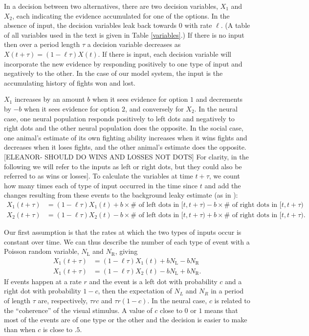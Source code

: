 \documentclass{article}
\begin{document}
In a decision between two alternatives, there are two decision variables, $X_1$ and $X_2$, each indicating the evidence accumulated for one of the options. In the absence of input, the decision variables leak back towards $0$ with rate $\ell$.  (A table of all variables used in the text is given in Table \ref{variables}.)  If there is no input then over a period length $\tau$ a decision variable decreases as $X(t+\tau)=(1-\ell\tau)X(t)$. If there is input, each decision variable will incorporate the new evidence by responding positively to one type of input and negatively to the other.  In the case of our model system, the input is the accumulating history of fights won and lost. 

$X_1$ increases by an amount $b$ when it sees evidence for option $1$ and decrements by $-b$ when it sees evidence for option $2$, and conversely for $X_2$.  In the neural case, one neural population responds positively to left dots and negatively to right dots and the other neural population does the opposite.  In the social case, one animal's estimate of its own fighting ability increases when it wins fights and decreases when it loses fights, and the other animal's estimate does the opposite.  [ELEANOR- SHOULD DO WINS AND LOSSES NOT DOTS] For clarity, in the following we will refer to the inputs as left or right dots, but they could also be referred to as wins or losses]. To calculate the variables at time $t+\tau$, we  count how many times each of type of input occurred in the time since $t$ and add the changes resulting from these events to the background leaky estimate (as in \cite{Gillespie:2000fk}):
\begin{align*}
X_1(t+\tau)&=(1-\ell\tau)X_1(t)+b\times\# \text{ of left dots in }[t,t+\tau)-b\times\# \text{ of right dots in }[t,t+\tau)
\\ X_2(t+\tau)&=(1-\ell\tau)X_2(t)-b\times\# \text{ of left dots in }[t,t+\tau)+b\times\# \text{ of right dots in }[t,t+\tau). 
\end{align*}

Our first assumption is that the rates at which the two types of inputs occur is constant over time.  We can thus describe the number of each type of event with a Poisson random variable, $N_\text{L}$ and $N_\text{R}$, giving 
\begin{align*}
X_1(t+\tau)&=(1-\ell\tau)X_1(t)+bN_\text{L}-bN_\text{R}
\\ X_1(t+\tau)&=(1-\ell\tau)X_2(t)-bN_\text{L}+bN_\text{R}.
\end{align*}
If events happen at a rate $r$ and the event is a left dot with probability $c$ and a right dot with probability $1-c$, then the expectation of $N_L$ and $N_R$ in a period of length $\tau$ are, respectively, $\tau r c$ and $\tau r(1-c)$. In the neural case, $c$ is related to the ``coherence'' of the visual stimulus.  A value of $c$ close to $0$ or $1$ means that most of the events are of one type or the other and the decision is easier to make than when $c$ is close to $.5$.
\end{document}
